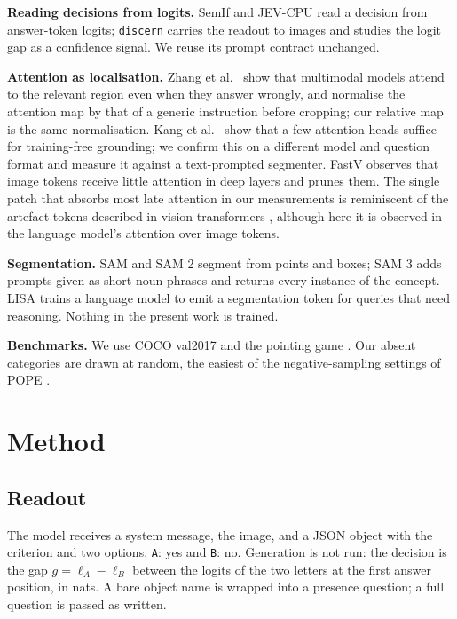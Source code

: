 \documentclass[10pt,twocolumn]{article}
\begin{document}
\textbf{Reading decisions from logits.} SemIf \cite{semif} and JEV-CPU
\cite{jevcpu} read a decision from answer-token logits; \texttt{discern}
\cite{discern} carries the readout to images and studies the logit gap as a
confidence signal. We reuse its prompt contract unchanged.

\textbf{Attention as localisation.} Zhang et al.\ \cite{zhang2025mllms} show
that multimodal models attend to the relevant region even when they answer
wrongly, and normalise the attention map by that of a generic instruction
before cropping; our relative map is the same normalisation. Kang et al.\
\cite{kang2025heads} show that a few attention heads suffice for training-free
grounding; we confirm this on a different model and question format and
measure it against a text-prompted segmenter. FastV \cite{chen2024fastv}
observes that image tokens receive little attention in deep layers and prunes
them. The single patch that absorbs most late attention in our measurements is
reminiscent of the artefact tokens described in vision transformers
\cite{darcet2024registers}, although here it is observed in the language
model's attention over image tokens.

\textbf{Segmentation.} SAM \cite{kirillov2023sam} and SAM 2
\cite{ravi2024sam2} segment from points and boxes; SAM 3
\cite{carion2025sam3} adds prompts given as short noun phrases and returns
every instance of the concept. LISA \cite{lai2024lisa} trains a language model
to emit a segmentation token for queries that need reasoning. Nothing in the
present work is trained.

\textbf{Benchmarks.} We use COCO val2017 \cite{lin2014coco} and the pointing
game \cite{zhang2016pointing}. Our absent categories are drawn at random, the
easiest of the negative-sampling settings of POPE \cite{li2023pope}.

\section{Method}

\subsection{Readout}

The model receives a system message, the image, and a JSON object with the
criterion and two options, \texttt{A}: yes and \texttt{B}: no. Generation is
not run: the decision is the gap $g = \ell_A - \ell_B$ between the logits of
the two letters at the first answer position, in nats. A bare object name is
wrapped into a presence question; a full question is passed as written.
\end{document}

